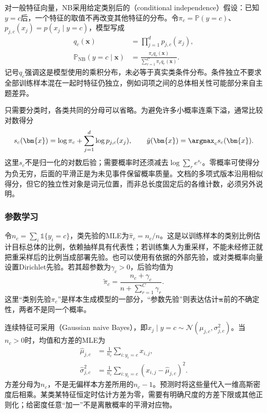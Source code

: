 对一般特征向量，NB采用给定类别后的（conditional independence）假设：已知$y=c$后，一个特征的取值不再改变其他特征的分布。令$\pi_c=\mathbb{P}(y=c)$、$p_{j,c}(x_j)=p(x_j\mid y=c)$，模型写成
\begin{equation}
  \label{eq:classification-naive-bayes-model}
  \begin{aligned}
    q_c(\bm{x})&=\prod_{j=1}^{d}p_{j,c}(x_j),\\
    \mathbb{P}_{\mathrm{NB}}(y=c\mid\bm{x})
      &=\frac{\pi_c q_c(\bm{x})}
      {\sum_{r=1}^{C}\pi_r q_r(\bm{x})}.
  \end{aligned}
\end{equation}
记号$q_c$强调这是模型使用的乘积分布，未必等于真实类条件分布。条件独立不要求全部训练样本混在一起时特征仍独立，例如词项之间的总体相关性可能部分来自主题差异。

只需要分类时，各类共同的分母可以省略。为避免许多小概率连乘下溢，通常比较对数得分
\begin{equation}
  \label{eq:classification-naive-bayes-score}
  s_c(\bm{x})
  =\log\pi_c+\sum_{j=1}^{d}\log p_{j,c}(x_j),
  \qquad
  \hat y(\bm{x})=\argmax_c s_c(\bm{x}).
\end{equation}
这里$s_c$不是归一化的对数后验；需要概率时还须减去$\log\sum_r e^{s_r}$。零概率可使得分为负无穷，后面的平滑正是为未见事件保留概率质量。文档的多项式版本沿用相似得分，但它的独立性对象是词元位置，而非总长度固定后的各维计数，必须另外说明。

\subsubsection{参数学习}
\label{sec:classification-naive-bayes-learning}

令$n_c=\sum_i\mathbb{1}\{y_i=c\}$，类先验的MLE为$\hat\pi_c=n_c/n$。这是以训练样本的类别比例估计目标总体的比例，依赖抽样具有代表性；若训练集人为重采样，不能未经修正就把重采样后的比例当成部署先验。也可以使用有依据的外部先验，或对类概率向量设置Dirichlet先验。若其超参数为$\gamma_c>0$，后验均值为
\[
  \tilde\pi_c=\frac{n_c+\gamma_c}
  {n+\sum_{r=1}^{C}\gamma_r}.
\]
这里“类别先验$\pi_c$”是样本生成模型的一部分，“参数先验”则表达估计$\bm{\pi}$前的不确定性，两者不是同一个概率。

连续特征可采用（Gaussian naive Bayes），即$x_j\mid y=c\sim\mathcal{N}(\mu_{j,c},\sigma_{j,c}^{2})$。当$n_c>0$时，均值和方差的MLE为
\begin{equation}
  \label{eq:classification-naive-bayes-gaussian}
  \begin{aligned}
    \hat\mu_{j,c}
      &=\frac{1}{n_c}\sum_{i:y_i=c}x_{i,j},\\
    \hat\sigma_{j,c}^{2}
      &=\frac{1}{n_c}\sum_{i:y_i=c}
        (x_{i,j}-\hat\mu_{j,c})^2.
  \end{aligned}
\end{equation}
方差分母为$n_c$，不是无偏样本方差所用的$n_c-1$。预测时将这些量代入一维高斯密度后相乘。某类某特征恒定时估计方差为零，需要有明确尺度的方差下限或其他正则化；给密度任意“加一”不是离散概率的平滑对应物。

